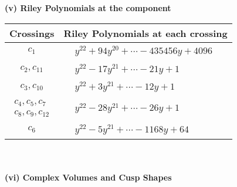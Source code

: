 \documentclass[1p]{elsarticle_modified}
\theoremstyle{definition}
\begin{document}
\newpage\renewcommand{\arraystretch}{1}
\flushleft \textbf{(v) Riley Polynomials at the component}\newline \\
\begin{tabular}{m{50pt}|m{274pt}}
Crossings & \hspace{64pt}Riley Polynomials at each crossing \\
\hline $$\begin{aligned}c_{1}\end{aligned}$$&$\begin{aligned}
&y^{22}+94 y^{20}+\cdots-435456 y+4096
\end{aligned}$\\
\hline $$\begin{aligned}c_{2},c_{11}\end{aligned}$$&$\begin{aligned}
&y^{22}-17 y^{21}+\cdots-21 y+1
\end{aligned}$\\
\hline $$\begin{aligned}c_{3},c_{10}\end{aligned}$$&$\begin{aligned}
&y^{22}+3 y^{21}+\cdots-12 y+1
\end{aligned}$\\
\hline $$\begin{aligned}c_{4},c_{5},c_{7}\\c_{8},c_{9},c_{12}\end{aligned}$$&$\begin{aligned}
&y^{22}-28 y^{21}+\cdots-26 y+1
\end{aligned}$\\
\hline $$\begin{aligned}c_{6}\end{aligned}$$&$\begin{aligned}
&y^{22}-5 y^{21}+\cdots-1168 y+64
\end{aligned}$\\
\hline
\end{tabular}\\~\\
\newpage\flushleft \textbf{(vi) Complex Volumes and Cusp Shapes}
\end{document}
